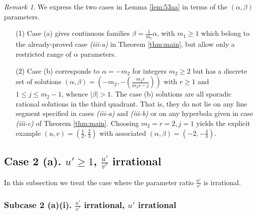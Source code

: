 \documentclass[12pt,letterpaper, reqno]{amsart}
\theoremstyle{definition}
\theoremstyle{remark}
\newtheorem{rmk}[thm]{Remark}
\newcommand{\uu}{{u'}}
\newcommand{\vv}{{v'}}
\begin{document}
\begin{rmk}\label{rem:54}
We express the two cases in Lemma \ref{lem:53aa} in terms of the $(\alpha, \beta)$ parameters.
\begin{enumerate}
\item[(1)]
Case (a) gives continuous families $\beta= \frac{1}{m_1} \alpha$, with $m_1 \ge 1$ 
which belong to the already-proved case {\it (iii-a)} in Theorem \ref{thm:main},
but allow only a restricted range of $\alpha$ parameters.
\item[(2)]
Case (b) corresponds to   $\alpha =-m_2$ for integers $m_2 \ge 2$ 
but has a discrete set of solutions $(\alpha, \beta) = (-m_2, - (\frac{m_2 r}{m_2 r -j}))$ with $r \ge 1$ and $1 \le j \le m_2 -1$, 
whence  $|\beta| >1$.
The case (b) solutions are all sporadic rational solutions in the third quadrant. That is, they do not
lie on any line segment specified in cases {\it (iii-a)} and {\it (iii-b)} or on any hyperbola given in case {\it (iii-c)}
of Theorem \ref{thm:main}.
Choosing $m_2=r=2, j=1$ yields the explicit example $(u, v) = (\frac{1}{2}, \frac{2}{3})$
with associated $(\alpha, \beta) = (-2, -\frac{4}{3})$.
\end{enumerate}
\end{rmk}


%
%
\subsection{Case 2 (a).  $ \uu\ge 1$, $\frac{\uu}{\vv}$ irrational}\label{sec:54}

 
In this subsection we treat the case where the parameter ratio $\frac{\uu}{\vv}$ is irrational. 

\subsubsection{ Subcase 2 (a)(i). $\frac{\uu}{\vv}$ irrational, ${\uu}$ irrational}\label{sec:541}
\end{document}
